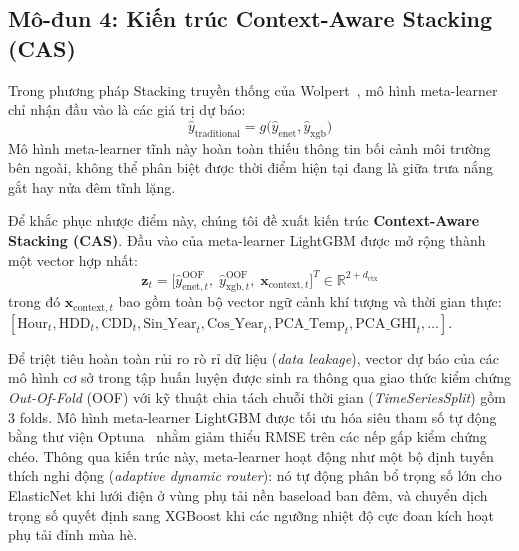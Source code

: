 \subsection{Mô-đun 4: Kiến trúc Context-Aware Stacking (CAS)}
Trong phương pháp Stacking truyền thống của Wolpert~\cite{wolpert1992stacked}, mô hình meta-learner chỉ nhận đầu vào là các giá trị dự báo:
\begin{equation}
    \hat{y}_{\text{traditional}} = g\big(\hat{y}_{\text{enet}}, \hat{y}_{\text{xgb}}\big)
\end{equation}
Mô hình meta-learner tĩnh này hoàn toàn thiếu thông tin bối cảnh môi trường bên ngoài, không thể phân biệt được thời điểm hiện tại đang là giữa trưa nắng gắt hay nửa đêm tĩnh lặng.

Để khắc phục nhược điểm này, chúng tôi đề xuất kiến trúc \textbf{Context-Aware Stacking (CAS)}. Đầu vào của meta-learner LightGBM được mở rộng thành một vector hợp nhất:
\begin{equation}
    \mathbf{z}_t = \Big[ \hat{y}_{\text{enet}, t}^{\text{OOF}}, \; \hat{y}_{\text{xgb}, t}^{\text{OOF}}, \; \mathbf{x}_{\text{context}, t} \Big]^T \in \mathbb{R}^{2 + d_{\text{ctx}}}
\end{equation}
trong đó $\mathbf{x}_{\text{context}, t}$ bao gồm toàn bộ vector ngữ cảnh khí tượng và thời gian thực: $[\text{Hour}_t, \text{HDD}_t, \text{CDD}_t, \text{Sin\_Year}_t, \text{Cos\_Year}_t, \text{PCA\_Temp}_t, \text{PCA\_GHI}_t, \dots]$.

Để triệt tiêu hoàn toàn rủi ro rò rỉ dữ liệu (\textit{data leakage}), vector dự báo của các mô hình cơ sở trong tập huấn luyện được sinh ra thông qua giao thức kiểm chứng \textit{Out-Of-Fold} (OOF) với kỹ thuật chia tách chuỗi thời gian (\textit{TimeSeriesSplit}) gồm 3 folds. Mô hình meta-learner LightGBM được tối ưu hóa siêu tham số tự động bằng thư viện Optuna~\cite{akiba2019optuna} nhằm giảm thiểu RMSE trên các nếp gấp kiểm chứng chéo. Thông qua kiến trúc này, meta-learner hoạt động như một bộ định tuyến thích nghi động (\textit{adaptive dynamic router}): nó tự động phân bổ trọng số lớn cho ElasticNet khi lưới điện ở vùng phụ tải nền baseload ban đêm, và chuyển dịch trọng số quyết định sang XGBoost khi các ngưỡng nhiệt độ cực đoan kích hoạt phụ tải đỉnh mùa hè.
